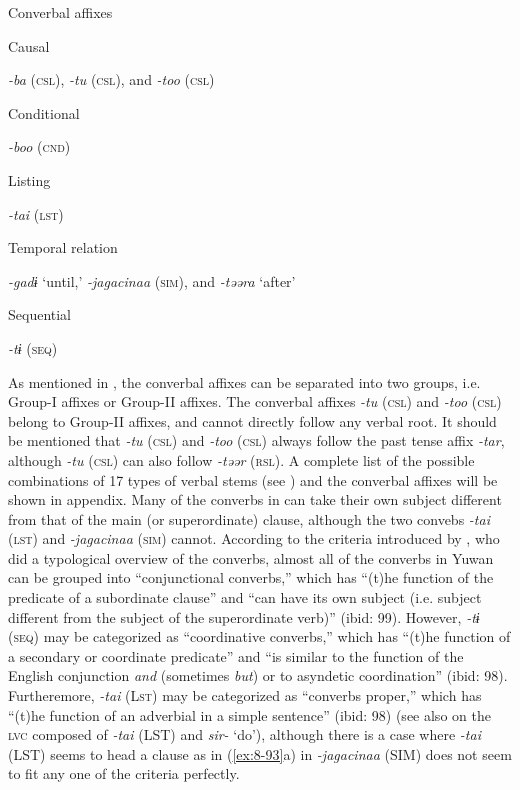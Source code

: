 \ea\label{ex:8-84}
  Converbal affixes

\ea Causal

    \textit{-ba} (\textsc{csl}), \textit{-tu} (\textsc{csl}), and \textit{-too} (\textsc{csl})

\ex Conditional

    \textit{-boo} (\textsc{cnd})

\ex Listing

    \textit{-tai} (\textsc{lst})

\ex Temporal relation

    \textit{-gadɨ} ‘until,’ \textit{-jagacinaa} (\textsc{sim}), and \textit{-təəra} ‘after’

\ex Sequential

    \textit{-tɨ} (\textsc{seq})
\z
\z

As mentioned in , the converbal affixes can be separated into two groups, i.e. Group-I affixes or Group-II affixes. The converbal affixes \textit{-tu} (\textsc{csl}) and \textit{-too} (\textsc{csl}) belong to Group-II affixes, and cannot directly follow any verbal root. It should be mentioned that \textit{-tu} (\textsc{csl}) and \textit{-too} (\textsc{csl}) always follow the past tense affix \textit{-tar}, although \textit{-tu} (\textsc{csl}) can also follow \textit{-təər} (\textsc{rsl}). A complete list of the possible combinations of 17 types of verbal stems (see ) and the converbal affixes will be shown in appendix. Many of the converbs in  can take their own subject different from that of the main (or superordinate) clause, although the two convebs \textit{-tai} (\textsc{lst}) and \textit{-jagacinaa} (\textsc{sim}) cannot. According to the criteria introduced by \citet[98-99]{Nedjalkov1995}, who did a typological overview of the converbs, almost all of the converbs in Yuwan can be grouped into “conjunctional converbs,” which has “(t)he function of the predicate of a subordinate clause” and “can have its own subject (i.e. subject different from the subject of the superordinate verb)” (ibid: 99). However, \textit{-tɨ} (\textsc{seq}) may be categorized as “coordinative converbs,” which has “(t)he function of a secondary or coordinate predicate” and “is similar to the function of the English conjunction \textit{and} (sometimes \textit{but}) or to asyndetic coordination” (ibid: 98). Furtheremore, \textit{-tai} (L\textsc{st}) may be categorized as “converbs proper,” which has “(t)he function of an adverbial in a simple sentence” (ibid: 98) (see also  on the \textsc{lvc} composed of \textit{-tai} (LST) and \textit{sir-} ‘do’), although there is a case where \textit{-tai} (LST) seems to head a clause as in (\ref{ex:8-93}a) in  \textit{-jagacinaa} (SIM) does not seem to fit any one of the criteria perfectly.


